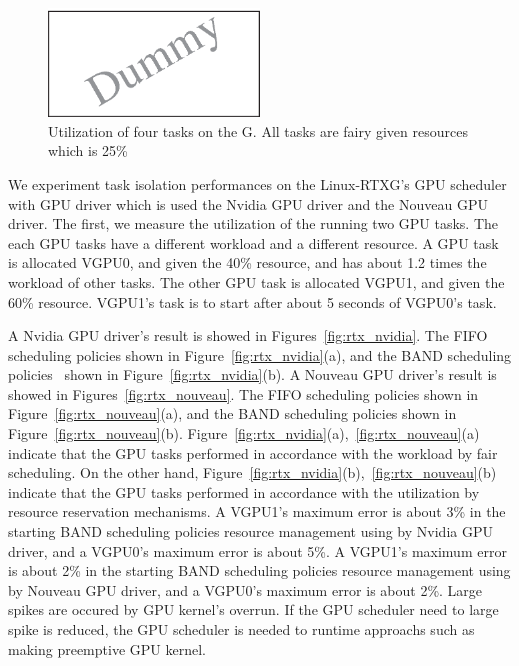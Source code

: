 \begin{figure}[t]
\begin{center}
\includegraphics[width=0.5\textwidth]{img/dummy}
\caption{Utilization of four tasks on the G. All tasks are fairy given resources which is 25\%}
\end{center}
\label{fig:qos_gdev}
\end{figure}
\fi

We experiment task isolation performances on the Linux-RTXG's GPU scheduler with GPU driver which is used the Nvidia GPU driver and the Nouveau GPU driver.
The first, we measure the utilization of the running two GPU tasks.
The each GPU tasks have a different workload and a different resource.
A GPU task is allocated VGPU0, and given the 40\% resource, and has about 1.2 times the workload of other tasks.
The other GPU task is allocated VGPU1, and given the 60\% resource.
VGPU1's task is to start after about 5 seconds of VGPU0's task.

A Nvidia GPU driver's result is showed in Figures~\ref{fig:rtx_nvidia}.
The FIFO scheduling policies shown in Figure~\ref{fig:rtx_nvidia}(a),
and the BAND scheduling policies~\cite{kato:gdev} shown in Figure~\ref{fig:rtx_nvidia}(b).
A Nouveau GPU driver's result is showed in Figures~\ref{fig:rtx_nouveau}.
The FIFO scheduling policies shown in Figure~\ref{fig:rtx_nouveau}(a),
and the BAND scheduling policies shown in Figure~\ref{fig:rtx_nouveau}(b).
Figure~\ref{fig:rtx_nvidia}(a),~\ref{fig:rtx_nouveau}(a) indicate that the GPU tasks performed in accordance with the workload by fair scheduling.
On the other hand, Figure~\ref{fig:rtx_nvidia}(b),~\ref{fig:rtx_nouveau}(b) indicate that the GPU tasks performed in accordance with the utilization by resource reservation mechanisms.
A VGPU1's maximum error is about 3\% in the starting BAND scheduling policies resource management using by Nvidia GPU driver, and a VGPU0's maximum error is about 5\%.
A VGPU1's maximum error is about 2\% in the starting BAND scheduling policies resource management using by Nouveau GPU driver, and a VGPU0's maximum error is about 2\%.
Large spikes are occured by GPU kernel's overrun.
If the GPU scheduler need to large spike is reduced, the GPU scheduler is needed to runtime approachs such as making preemptive GPU kernel.

